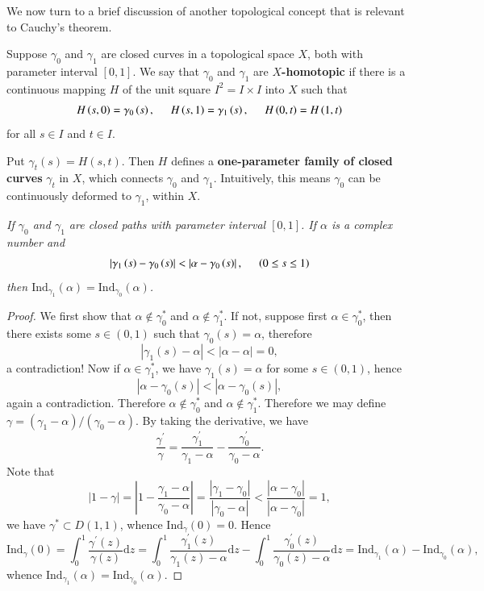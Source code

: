 We now turn to a brief discussion of another topological concept that is relevant to Cauchy's theorem.
\begin{definition}
Suppose $\gamma_0$ and $\gamma_1$ are closed curves in a topological space $X$, both with parameter interval $[0,1]$. We say that $\gamma_0$ and $\gamma_1$ are \textbf{$X$-homotopic} if there is a continuous mapping $H$ of the unit square $I^2=I\times I$ into $X$ such that 
$$
H\left( s,0 \right) =\gamma _0\left( s \right) ,\hspace{0.5cm}H\left( s,1 \right) =\gamma _1\left( s \right) ,\hspace{0.5cm}H\left( 0,t \right) =H\left( 1,t \right) 
$$
for all $s\in I$ and $t\in I$.
\end{definition}
Put $\gamma_t(s)=H(s,t)$. Then $H$ defines a \textbf{one-parameter family of closed curves} $\gamma_t$ in $X$, which connects $\gamma_0$ and $\gamma_1$. Intuitively, this means $\gamma_0$ can be continuously deformed to $\gamma_1$, within $X$.
\begin{lemma}\em
If $\gamma_0$ and $\gamma_1$ are closed paths with parameter interval $[0,1]$. If $\alpha$ is a complex number and 
$$
\left| \gamma _1\left( s \right) -\gamma _0\left( s \right) \right|<\left| \alpha -\gamma _0\left( s \right) \right|,\hspace{0.5cm}\left( 0\le s\le 1 \right) 
$$
then $\mathrm{Ind}_{\gamma_1}(\alpha)=\mathrm{Ind}_{\gamma_0}(\alpha)$.
\end{lemma}
\begin{proof}
We first show that $\alpha\notin\gamma_0^*$ and $\alpha\notin\gamma_1^*$. If not, suppose first $\alpha\in\gamma_0^*$, then there exists some $s\in (0,1)$ such that $\gamma_0(s)=\alpha$, therefore 
$$
\left| \gamma _1\left( s \right) -\alpha \right|<\left| \alpha -\alpha \right|=0,
$$
a contradiction! Now if $\alpha\in\gamma_1^*$, we have $\gamma_1(s)=\alpha$ for some $s\in (0,1)$, hence 
$$
\left| \alpha -\gamma _0\left( s \right) \right|<\left| \alpha -\gamma _0\left( s \right) \right|,
$$
again a contradiction. Therefore $\alpha\notin\gamma_0^*$ and $\alpha\notin\gamma_1^*$. Therefore we may define $\gamma=(\gamma_1-\alpha)/(\gamma_0-\alpha)$. By taking the derivative, we have 
$$
\frac{\gamma ^{\prime}}{\gamma}=\frac{\gamma _{1}^{\prime}}{\gamma _1-\alpha}-\frac{\gamma _{0}^{\prime}}{\gamma _0-\alpha}.
$$
Note that 
$$
\left| 1-\gamma \right|=\left| 1-\frac{\gamma _1-\alpha}{\gamma _0-\alpha} \right|=\frac{\left| \gamma _1-\gamma _0 \right|}{\left| \gamma _0-\alpha \right|}<\frac{\left| \alpha -\gamma _0 \right|}{\left| \alpha -\gamma _0 \right|}=1,
$$
we have $\gamma^*\subset D(1,1)$, whence $\mathrm{Ind}_\gamma(0)=0$. Hence 
$$
\mathrm{Ind}_{\gamma}\left( 0 \right) =\int_0^1{\frac{\gamma ^{\prime}\left( z \right)}{\gamma \left( z \right)}\mathrm{d}z}=\int_0^1{\frac{\gamma _{1}^{\prime}\left( z \right)}{\gamma _1\left( z \right) -\alpha}\mathrm{d}z}-\int_0^1{\frac{\gamma _{0}^{\prime}\left( z \right)}{\gamma _0\left( z \right) -\alpha}\mathrm{d}z}=\mathrm{Ind}_{\gamma _1}\left( \alpha \right) -\mathrm{Ind}_{\gamma _0}\left( \alpha \right) ,
$$
whence $\mathrm{Ind}_{\gamma_1}(\alpha)=\mathrm{Ind}_{\gamma_0}(\alpha)$.
\end{proof}
